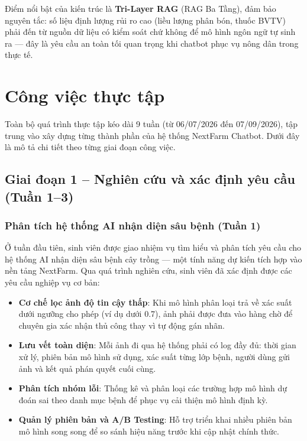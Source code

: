 Điểm nổi bật của kiến trúc là \textbf{Tri-Layer RAG} (RAG Ba Tầng), đảm bảo nguyên tắc: số liệu định lượng rủi ro cao (liều lượng phân bón, thuốc BVTV) phải đến từ nguồn dữ liệu có kiểm soát chứ không để mô hình ngôn ngữ tự sinh ra --- đây là yêu cầu an toàn tối quan trọng khi chatbot phục vụ nông dân trong thực tế.

\section{Công việc thực tập}

Toàn bộ quá trình thực tập kéo dài 9 tuần (từ 06/07/2026 đến 07/09/2026), tập trung vào xây dựng từng thành phần của hệ thống NextFarm Chatbot. Dưới đây là mô tả chi tiết theo từng giai đoạn công việc.

\subsection{Giai đoạn 1 -- Nghiên cứu và xác định yêu cầu (Tuần 1--3)}

\subsubsection{Phân tích hệ thống AI nhận diện sâu bệnh (Tuần 1)}

Ở tuần đầu tiên, sinh viên được giao nhiệm vụ tìm hiểu và phân tích yêu cầu cho hệ thống AI nhận diện sâu bệnh cây trồng --- một tính năng dự kiến tích hợp vào nền tảng NextFarm. Qua quá trình nghiên cứu, sinh viên đã xác định được các yêu cầu nghiệp vụ cơ bản:

\begin{itemize}
    \item \textbf{Cơ chế lọc ảnh độ tin cậy thấp}: Khi mô hình phân loại trả về xác suất dưới ngưỡng cho phép (ví dụ dưới 0.7), ảnh phải được đưa vào hàng chờ để chuyên gia xác nhận thủ công thay vì tự động gán nhãn.
    \item \textbf{Lưu vết toàn diện}: Mỗi ảnh đi qua hệ thống phải có log đầy đủ: thời gian xử lý, phiên bản mô hình sử dụng, xác suất từng lớp bệnh, người dùng gửi ảnh và kết quả phán quyết cuối cùng.
    \item \textbf{Phân tích nhóm lỗi}: Thống kê và phân loại các trường hợp mô hình dự đoán sai theo danh mục bệnh để phục vụ cải thiện mô hình định kỳ.
    \item \textbf{Quản lý phiên bản và A/B Testing}: Hỗ trợ triển khai nhiều phiên bản mô hình song song để so sánh hiệu năng trước khi cập nhật chính thức.
\end{itemize}

